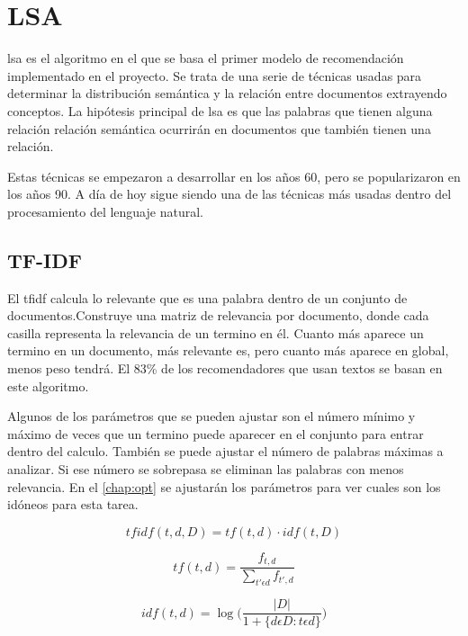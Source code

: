 \documentclass[withindex, glossary]{cam-thesis}
\begin{document}
\chapter{LSA}\label{chap:lsa}
\acrfull{lsa} es el algoritmo en el que se basa el primer modelo de recomendación implementado en el proyecto. Se trata de una serie de técnicas usadas para determinar la distribución semántica y la relación entre documentos extrayendo conceptos. La hipótesis principal de \acrshort{lsa} es que las palabras que tienen alguna relación relación semántica ocurrirán en documentos que también tienen una relación.

Estas técnicas se empezaron a desarrollar en los años 60\cite{Borko:1963:ADC:321160.321165}, pero se popularizaron en los años 90\cite{Deerwester90indexingby}. A día de hoy sigue siendo una de las técnicas más usadas dentro del procesamiento del lenguaje natural.

\section{TF-IDF}
El \acrfull{tfidf} calcula lo relevante que es una palabra dentro de un conjunto de documentos.Construye una matriz de relevancia por documento, donde cada casilla representa la relevancia de un termino en él. Cuanto más aparece un termino en un documento, más relevante es, pero cuanto más aparece en global, menos peso tendrá. El 83\% de los recomendadores que usan textos se basan en este algoritmo\cite{Beel2016}.

Algunos de los parámetros que se pueden ajustar son el número mínimo y máximo de veces que un termino puede aparecer en el conjunto para entrar dentro del calculo. También se puede ajustar el número de palabras máximas a analizar. Si ese número se sobrepasa se eliminan las palabras con menos relevancia. En el \autoref{chap:opt} se ajustarán los parámetros para ver cuales son los idóneos para esta tarea.

\begin{equation} \label{eq:tf-idf}
    tfidf(t, d, D) = tf(t, d) \cdot idf(t, D)
\end{equation}

\begin{equation} \label{eq:tf}
    tf(t, d) = \dfrac{f_{t, d}}{\sum_{t' \epsilon d}^{}f_{t', d}}
\end{equation}

\begin{equation} \label{eq:idf}
    idf(t, d) = \log\biggl(\dfrac{|D|}{1 + \{d \epsilon D : t \epsilon d \}}\biggr)
\end{equation}
\end{document}
